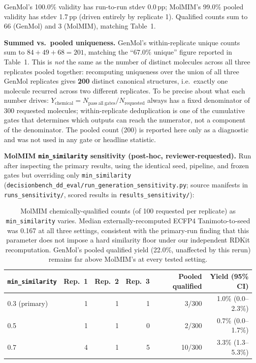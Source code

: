 \documentclass{article}
\begin{document}
GenMol's 100.0\% validity has run-to-run stdev 0.0\,pp; MolMIM's 99.0\% pooled validity has stdev 1.7\,pp (driven entirely by replicate 1). Qualified counts sum to 66 (GenMol) and 3 (MolMIM), matching Table~1.

\textbf{Summed vs.\ pooled uniqueness.} GenMol's within-replicate unique counts sum to $84+49+68=201$, matching the ``67.0\% unique'' figure reported in Table~1. This is \emph{not} the same as the number of distinct molecules across all three replicates pooled together: recomputing uniqueness over the union of all three GenMol replicates gives \textbf{200} distinct canonical structures, i.e.\ exactly one molecule recurred across two different replicates. To be precise about what each number drives: $Y_{\mathrm{chemical}} = N_{\mathrm{pass\ all\ gates}}/N_{\mathrm{requested}}$ always has a fixed denominator of 300 requested molecules; within-replicate deduplication is one of the cumulative gates that determines which outputs can reach the numerator, not a component of the denominator. The pooled count (200) is reported here only as a diagnostic and was not used in any gate or headline statistic.

\textbf{MolMIM \texttt{min\_similarity} sensitivity (post-hoc, reviewer-requested).} Run after inspecting the primary results, using the identical seed, pipeline, and frozen gates but overriding only \texttt{min\_similarity} (\texttt{decisionbench\_dd\_eval/run\_generation\_sensitivity.py}; source manifests in \texttt{runs\_sensitivity/}, scored results in \texttt{results\_sensitivity/}):

\begin{table}[h]
\centering
\footnotesize
\begin{tabular}{lrrrrr}
\toprule
\texttt{min\_similarity} & Rep.\ 1 & Rep.\ 2 & Rep.\ 3 & Pooled qualified & Yield (95\% CI) \\
\midrule
0.3 (primary) & 1 & 1 & 1 & 3/300 & 1.0\% (0.0--2.3\%) \\
0.5 & 1 & 1 & 0 & 2/300 & 0.7\% (0.0--1.7\%) \\
0.7 & 4 & 1 & 5 & 10/300 & 3.3\% (1.3--5.3\%) \\
\bottomrule
\end{tabular}
\caption{MolMIM chemically-qualified counts (of 100 requested per replicate) as \texttt{min\_similarity} varies. Median externally-recomputed ECFP4 Tanimoto-to-seed was 0.167 at all three settings, consistent with the primary-run finding that this parameter does not impose a hard similarity floor under our independent RDKit recomputation. GenMol's pooled qualified yield (22.0\%, unaffected by this rerun) remains far above MolMIM's at every tested setting.}
\end{table}
\end{document}
